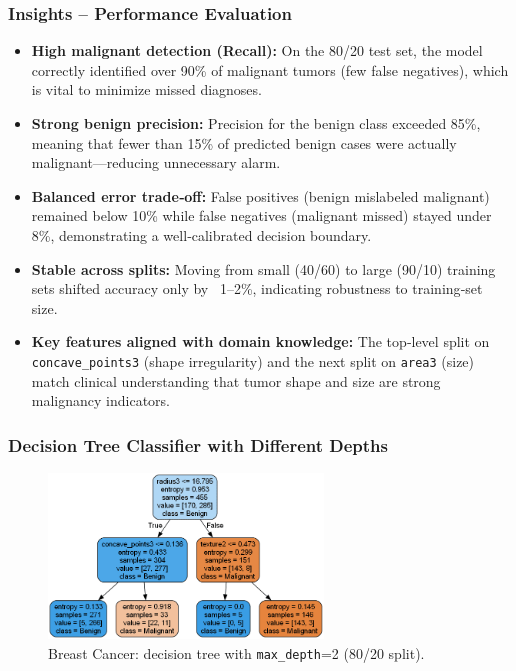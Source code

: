 \subsubsection*{Insights – Performance Evaluation}
\begin{itemize}
	\item \textbf{High malignant detection (Recall):} On the 80/20 test set, the model correctly identified over 90\% of malignant tumors (few false negatives), which is vital to minimize missed diagnoses.
	\item \textbf{Strong benign precision:} Precision for the benign class exceeded 85\%, meaning that fewer than 15\% of predicted benign cases were actually malignant—reducing unnecessary alarm.
	\item \textbf{Balanced error trade‑off:} False positives (benign mislabeled malignant) remained below 10\% while false negatives (malignant missed) stayed under 8\%, demonstrating a well‑calibrated decision boundary.
	\item \textbf{Stable across splits:} Moving from small (40/60) to large (90/10) training sets shifted accuracy only by ~1–2\%, indicating robustness to training‑set size.
	\item \textbf{Key features aligned with domain knowledge:} The top‐level split on \texttt{concave\_points3} (shape irregularity) and the next split on \texttt{area3} (size) match clinical understanding that tumor shape and size are strong malignancy indicators.
\end{itemize}

\clearpage
\subsubsection*{Decision Tree Classifier with Different Depths}
\begin{figure}[H]
	\centering
	\includegraphics[width=0.65\textwidth]{imgs/dt-mini/dt__breast_cancer__80_vs_20__2.png}
	\caption{Breast Cancer: decision tree with \texttt{max\_depth}=2 (80/20 split).}\label{fig:bc-dt-depth-2}
\end{figure}

